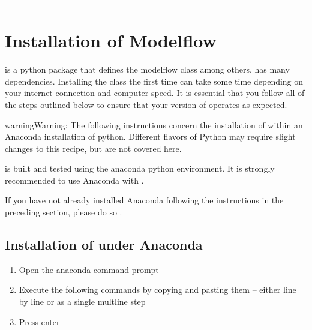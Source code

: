 \documentclass[letterpaper,10pt,english]{jupyterBook}
\begin{document}
\bigskip\hrule\bigskip


\sphinxstepscope


\section{Installation of Modelflow}
\label{\detokenize{content/03_Installation/InstallingModelFlow:installation-of-modelflow}}\label{\detokenize{content/03_Installation/InstallingModelFlow::doc}}
\sphinxAtStartPar
{} is a python package that defines the modelflow class  among others.   has many dependencies. Installing the class the first time can take some time depending on your internet connection and computer speed.  It is essential that you follow all of the steps outlined below to ensure that your version of  operates as expected.

\begin{sphinxadmonition}{warning}{Warning:}
\sphinxAtStartPar
The following instructions concern the installation of  within an Anaconda installation of python.  Different flavors of Python may require slight changes to this recipe, but are not covered here.

\sphinxAtStartPar
{} is built and tested using the anaconda python environment.  It is strongly recommended to use Anaconda with .

\sphinxAtStartPar
If you have not already installed Anaconda following the instructions in the preceding section, please do so .
\end{sphinxadmonition}


\subsection{Installation of  under Anaconda}
\label{\detokenize{content/03_Installation/InstallingModelFlow:installation-of-modelflow-under-anaconda}}\begin{enumerate}
%
\item {} 
\sphinxAtStartPar
Open the anaconda command prompt

\item {} 
\sphinxAtStartPar
Execute the following commands by copying and pasting them – either line by line or as a single mult\sphinxhyphen{}line step

\item {} 
\sphinxAtStartPar
Press enter

\end{enumerate}
\end{document}
